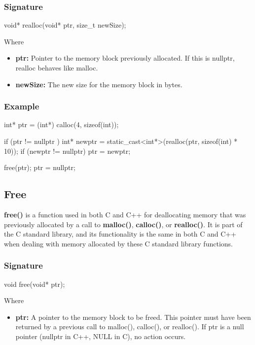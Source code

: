 \documentclass{report}
\begin{document}
    \subsubsection{Signature}
    \bigbreak \noindent 
    \begin{cppcode}
    void* realloc(void* ptr, size_t newSize);
    \end{cppcode}
    \bigbreak \noindent 
    Where 
    \bigbreak \noindent 
    \begin{itemize}
        \item \textbf{ptr:} Pointer to the memory block previously allocated. If this is nullptr, realloc behaves like malloc.
        \item \textbf{newSize:} The new size for the memory block in bytes.
    \end{itemize}

    \bigbreak \noindent 
    \subsubsection{Example}
    \bigbreak \noindent 
    \begin{cppcode}
    int* ptr = (int*) calloc(4, sizeof(int));

    if (ptr != nullptr ) {
        int* newptr = static_cast<int*>(realloc(ptr, sizeof(int) * 10));
        if (newptr != nullptr) {
            ptr = newptr;
        } 
    }

    free(ptr);
    ptr = nullptr;
    \end{cppcode}
    

    \bigbreak \noindent 
    \subsection{Free}
    \bigbreak \noindent 
    \begin{concept}
        \textbf{free()} is a function used in both C and C++ for deallocating memory that was previously allocated by a call to \textbf{malloc()}, \textbf{calloc()}, or \textbf{realloc()}. It is part of the C standard library, and its functionality is the same in both C and C++ when dealing with memory allocated by these C standard library functions. 
    \end{concept}
    \bigbreak \noindent 
    \subsubsection{Signature}
    \bigbreak \noindent 
    \begin{cppcode}
    void free(void* ptr);
    \end{cppcode}
    \bigbreak \noindent 
    Where
    \begin{itemize}
        \item \textbf{ptr:} A pointer to the memory block to be freed. This pointer must have been returned by a previous call to malloc(), calloc(), or realloc(). If ptr is a null pointer (nullptr in C++, NULL in C), no action occurs.
    \end{itemize}
    
\end{document}
